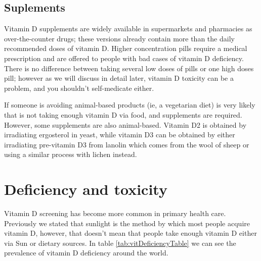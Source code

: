 \subsection{Suplements}

Vitamin D supplements are widely available in supermarkets and pharmacies as over-the-counter drugs; these versions already contain more than the daily recommended doses of vitamin D. Higher concentration pills require a medical prescription and are offered to people with bad cases of vitamin D deficiency. There is no difference between taking several low doses of pills or one high doses pill; however as we will discuss in detail later, vitamin D toxicity can be a problem, and you shouldn't self-medicate either.\vspace{3 mm}

If someone is avoiding animal-based products (ie, a vegetarian diet) is very likely that is not taking enough vitamin D via food, and supplements are required. However, some supplements are also animal-based. Vitamin D2 is obtained by irradiating ergosterol in yeast, while vitamin D3 can be obtained by either irradiating pre-vitamin D3 from lanolin which comes from the wool of sheep or using a similar process with lichen instead.\vspace{3 mm}


\section{Deficiency and toxicity}

Vitamin D screening has become more common in primary health care. Previously we stated that sunlight is the method by which most people acquire vitamin D, however, that doesn't mean that people take enough vitamin D either via Sun or dietary sources. In table \ref{tab:vitDeficiencyTable} we can see the prevalence of vitamin D deficiency around the world.\vspace{3 mm}


